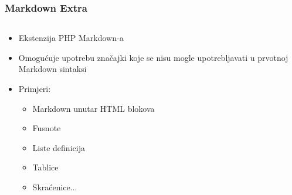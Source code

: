 \documentclass{beamer}
\begin{document}
\begin{frame}
	\frametitle{Markdown Extra}

 	\begin{minipage}[0.2\textheight]{\textwidth}
 	\begin{columns}[T]
 	\begin{column}{0.8\textwidth}
 	\begin{itemize}
 		\item{Ekstenzija PHP Markdown-a}
		\item{Omogućuje upotrebu značajki koje se nisu mogle upotrebljavati u prvotnoj Markdown sintaksi}
		\item{Primjeri: 
		\begin{itemize}
			\item{Markdown unutar HTML blokova}
			\item{Fusnote}
			\item{Liste definicija}
			\item{Tablice}
			\item{Skraćenice}...
		\end{itemize}}
	\end{itemize}
	\end{column}
	\end{columns}
	\end{minipage}

\end{frame}
\end{document}

